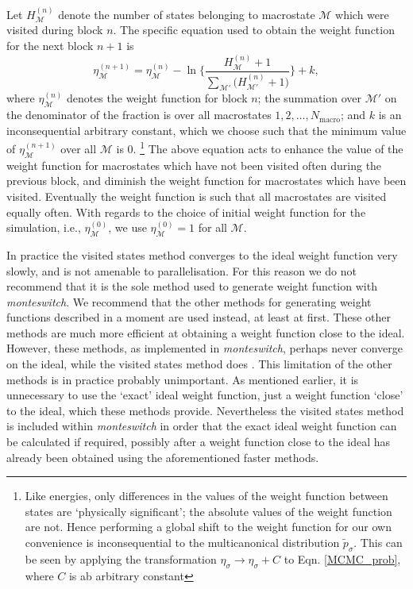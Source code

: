 \documentclass{report}
\begin{document}
Let $H^{(n)}_{\mathcal{M}}$ denote the number of states belonging to macrostate $\mathcal{M}$ which were visited during block $n$.
The specific equation used to obtain the weight function for the next block $n+1$ is
\begin{equation}
\eta^{(n+1)}_{\mathcal{M}}=\eta^{(n)}_{\mathcal{M}}-\ln\Biggl\lbrace
\frac{H^{(n)}_{\mathcal{M}}+1}{\sum_{\mathcal{M}'}\bigl(H^{(n)}_{\mathcal{M}'}+1\bigr)}
\Biggr\rbrace
+k,
\end{equation}
where $\eta^{(n)}_{\mathcal{M}}$ denotes the weight function for block $n$; the summation over $\mathcal{M}'$ on the denominator of the fraction is
over all macrostates $1,2,\dotsc,N_{\text{macro}}$; and $k$ is an inconsequential arbitrary constant, which we choose such that the minimum value of 
$\eta^{(n+1)}_{\mathcal{M}}$ over all $\mathcal{M}$ is 0.
\footnote{Like energies, only differences in the values of the weight function between states are `physically significant'; the absolute values 
of the weight function are not. Hence performing a global shift to the weight function for our own convenience is inconsequential to the
multicanonical distribution $\tilde{p}_{\sigma}$. This can be seen by applying the transformation $\eta_{\sigma}\to\eta_{\sigma}+C$ to Eqn. \eqref{MCMC_prob},
where $C$ is ab arbitrary constant}
The above equation acts to enhance the value of the weight function for macrostates which have not been visited often during the previous block, and
diminish the weight function for macrostates which have been visited. Eventually the weight function is such that all macrostates are visited equally
often. 
With regards to the choice of initial weight function for the simulation, i.e., $\eta^{(0)}_{\mathcal{M}}$, we use $\eta^{(0)}_{\mathcal{M}}=1$
for all $\mathcal{M}$. 

In practice the visited states method converges to the ideal weight function very slowly, and is not amenable to parallelisation. 
For this reason we do not recommend that it is the sole method used to 
generate weight function with \emph{monteswitch}. We recommend that the other methods for generating weight functions described 
in a moment are used instead, at least at first. These other methods are much more efficient at obtaining a weight function close to the ideal. 
However, these methods, as implemented in \emph{monteswitch}, perhaps never converge on the ideal, while the visited states method does \cite{Smith_1995}. 
This limitation of the other methods is in practice probably
unimportant. As mentioned earlier, it is unnecessary to use the `exact' ideal weight function, just a weight function `close' to the ideal, which
these methods provide. Nevertheless the visited states method is included within \emph{monteswitch} in order that the exact ideal weight function can
be calculated if required, possibly after a weight function close to the ideal has already been obtained using the aforementioned faster methods.
\end{document}
